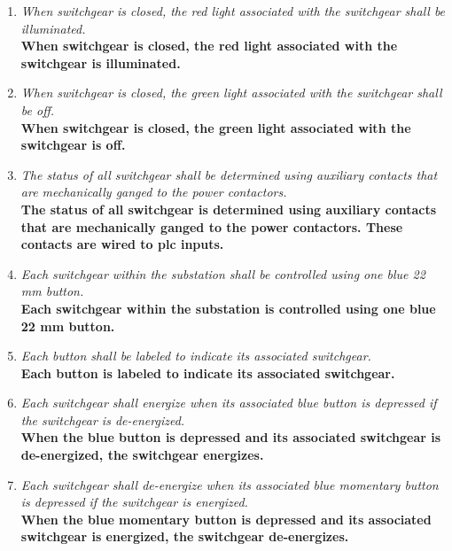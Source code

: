 \begin{enumerate}
	\item \emph{ When switchgear is closed, the red light associated
		      with the switchgear shall be illuminated.}\\
	      \textbf{When switchgear is closed, the red light associated with
		      the switchgear is illuminated.}

	\item \emph{ When switchgear is closed, the green light associated
		      with the switchgear shall be off.}\\
	      \textbf{When switchgear is closed, the green light associated
		      with the switchgear is off.}

	\item \emph{ The status of all switchgear shall be determined using
		      auxiliary contacts that are mechanically ganged to the power contactors.}\\
	      \textbf{The status of all switchgear is determined using
		      auxiliary contacts that are mechanically
		      ganged to the power contactors. These contacts are wired to
		      \gls{plc} inputs.}

	\item \emph{ Each switchgear within the substation shall be
		      controlled using one blue 22 mm button.}\\
	      \textbf{Each switchgear within the substation is controlled using
		      one blue 22 mm button.}

	\item \emph{ Each button shall be labeled to indicate its
		      associated switchgear.}\\
	      \textbf{Each button is labeled to indicate its associated switchgear.}

	\item \emph{ Each switchgear shall energize when its associated
		      blue button is depressed if the switchgear is de-energized.}\\
	      \textbf{When the blue button is depressed and its associated
		      switchgear is de-energized,
		      the switchgear energizes.}

	\item \emph{ Each switchgear shall de-energize when its associated
		      blue momentary button is depressed if the switchgear is energized.}\\
	      \textbf{When the blue momentary button is depressed and its
		      associated switchgear is energized,
		      the switchgear de-energizes.}


\end{enumerate}
